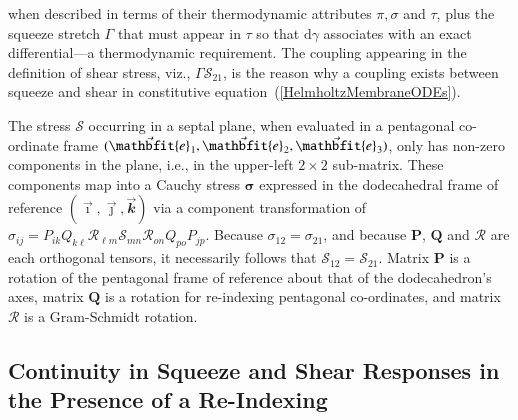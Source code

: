 when described in terms of their thermo\-dynamic attributes $\pi , \sigma$ and $\tau$, plus the squeeze stretch $\Gamma$ that must appear in $\tau$ so that $\mathrm{d} \gamma$ associates with an exact differential---a thermo\-dynamic requirement.  The coupling appearing in the definition of shear stress, viz., $\Gamma \mathcal{S}_{21}$, is the reason why a coupling exists between squeeze and shear in constitutive equation~(\ref{HelmholtzMembraneODEs}).

The stress $\boldsymbol{\mathcal{S}}$ occurring in a septal plane, when evaluated in a pentagonal co-ordinate frame $( \vec{\mathbfit{e}}_{\hspace{0.5pt}1} , \vec{\mathbfit{e}}_{\hspace{0.5pt}2} , \vec{\mathbfit{e}}_{\hspace{0.5pt}3} )$, only has non-zero components in the plane, i.e., in the upper-left $2 \times 2$ sub-matrix.  These components map into a Cauchy stress $\boldsymbol{\sigma}$ expressed in the dodecahedral frame of reference $( \vec{\boldsymbol{\imath}} , \vec{\boldsymbol{\jmath}} , \vec{\mathbfit{k}} )$ via a component transformation of $\sigma_{ij} = P_{ik} Q_{k\ell} \mathcal{R}_{\ell m} \mathcal{S}_{mn} \mathcal{R}_{on} Q_{po} P_{jp}$.   Because $\sigma_{12} = \sigma_{21}$, and because $\mathbf{P}$, $\mathbf{Q}$ and $\boldsymbol{\mathcal{R}}$ are each orthogonal tensors, it necessarily follows that $\mathcal{S}_{12} = \mathcal{S}_{21}$.  Matrix $\mathbf{P}$ is a rotation of the pentagonal frame of reference about that of the dodecahedron's axes, matrix $\mathbf{Q}$ is a rotation for re-indexing pentagonal co-ordinates, and matrix $\boldsymbol{\mathcal{R}}$ is a Gram-Schmidt rotation.

\subsection{Continuity in Squeeze and Shear Responses in the Presence of a Re-Indexing}

